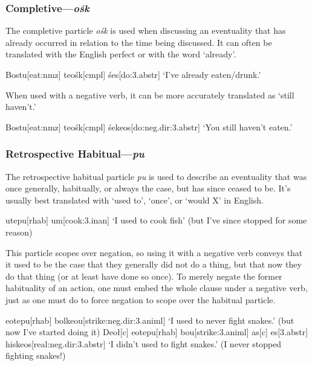 \documentclass[a4paper,11pt,oneside,openany]{memoir}
\begin{document}
\subsubsection{Completive---\textit{o\'sk}}

The completive particle \textit{o\'sk} is used when discussing an eventuality that has already occurred in relation to the time being discussed. It can often be translated with the English perfect or with the word `already'.

\ex 
\begingl
Bostu[eat:{\sc nmz}]
te\vd[\sc 1]
o\'sk[\sc cmpl]
\'ses[do:{\sc 3.abstr}]
\glft `I've already eaten/drunk.'
\endgl
\xe

When used with a negative verb, it can be more accurately translated as `still haven't.'

\ex 
\begingl
Bostu[eat:{\sc nmz}]
te\vd[\sc 1]
o\'sk[\sc cmpl]
\'sekeos[do:{\sc neg.dir:3.abstr}]
\glft `You still haven't eaten.'
\endgl
\xe

\subsubsection{Retrospective Habitual---\textit{pu}}

The retrospective habitual particle \textit{pu} is used to describe an eventuality that was once generally, habitually, or always the case, but has since ceased to be. It's usually best translated with `used to', `once', or `would X' in English.

\ex 
\begingl
\Engma u\vz[fish]
te\vd[\sc 1]
pu[\sc rhab]
\vr um[cook:{\sc 3.inan}]
\glft `I used to cook fish' (but I've since stopped for some reason)
\endgl
\xe

This particle scopes over negation, so using it with a negative verb conveys that it used to be the case that they generally did not do a thing, but that now they do that thing (or at least have done so once). To merely negate the former habituality of an action, one must embed the whole clause under a negative verb, just as one must do to force negation to scope over the habitual particle.

\pex 
\a
\begingl 
\vS\vr eo\vd[snake]
te\vd[\sc 1]
pu[\sc rhab]
bolkeo\vs u[strike:{\sc neg.dir:3.animl}]
\glft `I used to never fight snakes.' (but now I've started doing it)
\endgl 
\a
\begingl
Deo\l[\sc c]
\vs\vr eo\vd[snake]
te\vd[\sc 1]
pu[\sc rhab]
bo\vl\vs u[strike:{\sc 3.animl}]
\nogloss{,}
as[\sc c]
es[\sc 3.abstr]
his\engma keos[real:{\sc neg.dir:3.abstr}]
\glft `I didn't used to fight snakes.' (I never stopped fighting snakes!)
\endgl 
\xe
\end{document}
